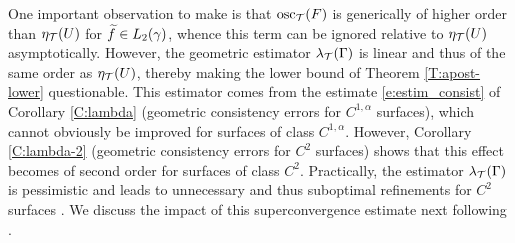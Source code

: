 One important observation to make is that $\mathrm{osc}_{\mathcal{T}}(F)$ is generically
of higher order than $\eta_{\mathcal{T}}(U)$ for $\widetilde{f}\in L_2(\gamma)$, whence
this term can be ignored relative to $\eta_{\mathcal{T}}(U)$ asymptotically. However,
the geometric estimator $\lambda_{\mathcal{T}}(\Gamma)$ is linear and thus of the same
order as $\eta_{\mathcal{T}}(U)$, thereby making the lower bound of Theorem \ref{T:apost-lower}
questionable. This estimator comes from the estimate \eqref{e:estim_consist}
of Corollary \ref{C:lambda} (geometric consistency errors for $C^{1,\alpha}$ surfaces), which cannot obviously be improved for surfaces
of class $C^{1,\alpha}$. However, Corollary \ref{C:lambda-2}
(geometric consistency errors for $C^2$ surfaces) shows that this 
effect becomes of second order for surfaces of class $C^2$. Practically, the estimator
$\lambda_{\mathcal{T}}(\Gamma)$ is pessimistic and leads
to unnecessary and thus suboptimal refinements for $C^2$ surfaces \cite{BD:18}.
We discuss the impact of this superconvergence estimate next following
\cite{BD:18}.


